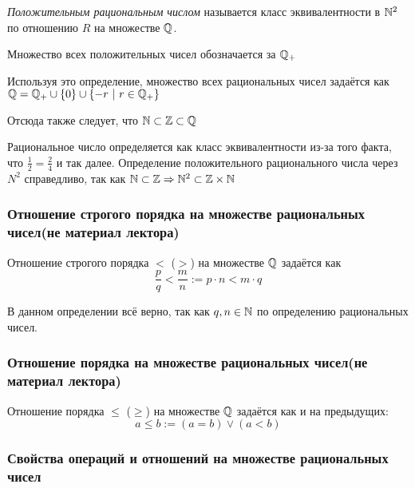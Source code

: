 \begin{definition}
    \textit{Положительным рациональным числом} называется класс эквивалентности в $\mathbb{N}^2$ по отношению $R$ на множестве $\mathbb{Q}$.
\end{definition}
    
Множество всех положительных чисел обозначается за $\mathbb{Q}_+$
    
Используя это определение, множество всех рациональных чисел задаётся как $\mathbb{Q} = \mathbb{Q}_+ \cup \{0\} \cup \{-r\ |\ r \in \mathbb{Q}_+\}$
    
Отсюда также следует, что $\mathbb{N} \subset \mathbb{Z} \subset \mathbb{Q}$ 

\begin{anote}
    Рациональное число определяется как класс эквивалентности из-за того факта, что $\frac{1}{2} = \frac{2}{4}$ и так далее. Определение положительного рационального числа через $N^2$ справедливо, так как $\mathbb{N} \subset \mathbb{Z} \Rightarrow \mathbb{N}^2 \subset \mathbb{Z} \times \mathbb{N}$
\end{anote}

\subsubsection*{Отношение строгого порядка на множестве рациональных чисел(не материал лектора)}

\begin{definition}
    Отношение строгого порядка $<$ ($>$) на множестве $\mathbb{Q}$ задаётся как
    $$
        \frac{p}{q} < \frac{m}{n} := p \cdot n < m \cdot q
    $$
\end{definition}

\begin{anote}
    В данном определении всё верно, так как $q, n \in \mathbb{N}$ по определению рациональных чисел.
\end{anote}

\subsubsection*{Отношение порядка на множестве рациональных чисел(не материал лектора)}

\begin{definition}
    Отношение порядка $\le$ ($\ge$) на множестве $\mathbb{Q}$ задаётся как и на предыдущих:
    $$
        a \le b := (a = b) \vee (a < b)
    $$
\end{definition}

\subsubsection*{Свойства операций и отношений на множестве рациональных чисел}

